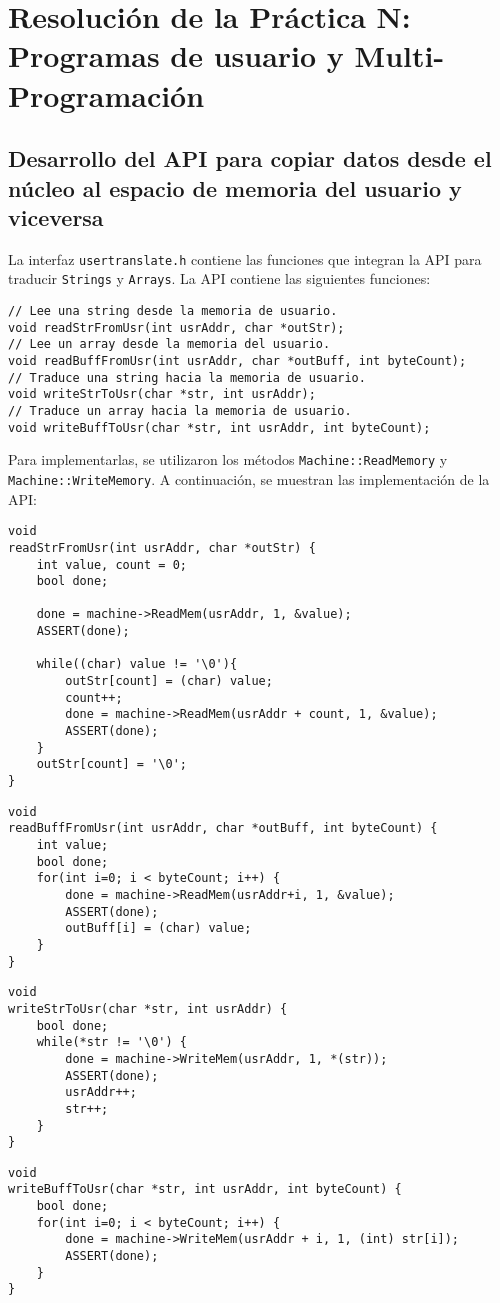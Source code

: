 \chapter{Resolución de la Práctica N: Programas de usuario y Multi-Programación}
\section{Desarrollo del API para copiar datos desde el núcleo al espacio de memoria del usuario y viceversa}
La interfaz \texttt{usertranslate.h} contiene las funciones que integran la API para traducir \texttt{Strings} y \texttt{Arrays}. La API contiene las siguientes funciones:
\begin{lstlisting}[style=C]
// Lee una string desde la memoria de usuario.
void readStrFromUsr(int usrAddr, char *outStr);
// Lee un array desde la memoria del usuario.
void readBuffFromUsr(int usrAddr, char *outBuff, int byteCount);
// Traduce una string hacia la memoria de usuario.
void writeStrToUsr(char *str, int usrAddr);
// Traduce un array hacia la memoria de usuario.
void writeBuffToUsr(char *str, int usrAddr, int byteCount);
\end{lstlisting}
Para implementarlas, se utilizaron los métodos \texttt{Machine::ReadMemory} y \texttt{Machine::WriteMemory}. A continuación, se muestran las implementación de la API:
\begin{lstlisting}[style=C]
void
readStrFromUsr(int usrAddr, char *outStr) {
    int value, count = 0;
    bool done;
   
    done = machine->ReadMem(usrAddr, 1, &value);
    ASSERT(done);
                
    while((char) value != '\0'){
        outStr[count] = (char) value;
        count++;
        done = machine->ReadMem(usrAddr + count, 1, &value);
        ASSERT(done);
    }
    outStr[count] = '\0';
}
\end{lstlisting}
\begin{lstlisting}[style=C]
void
readBuffFromUsr(int usrAddr, char *outBuff, int byteCount) {
    int value;
    bool done;
    for(int i=0; i < byteCount; i++) {
        done = machine->ReadMem(usrAddr+i, 1, &value);
        ASSERT(done);
        outBuff[i] = (char) value;
    }
}
\end{lstlisting}
\begin{lstlisting}[style=C]
void
writeStrToUsr(char *str, int usrAddr) {
    bool done;
    while(*str != '\0') {
        done = machine->WriteMem(usrAddr, 1, *(str));
        ASSERT(done);
        usrAddr++;
        str++;
    }
}
\end{lstlisting}
\begin{lstlisting}[style=C]
void
writeBuffToUsr(char *str, int usrAddr, int byteCount) {
    bool done;
    for(int i=0; i < byteCount; i++) {
        done = machine->WriteMem(usrAddr + i, 1, (int) str[i]);
        ASSERT(done);
    }
}
\end{lstlisting}
